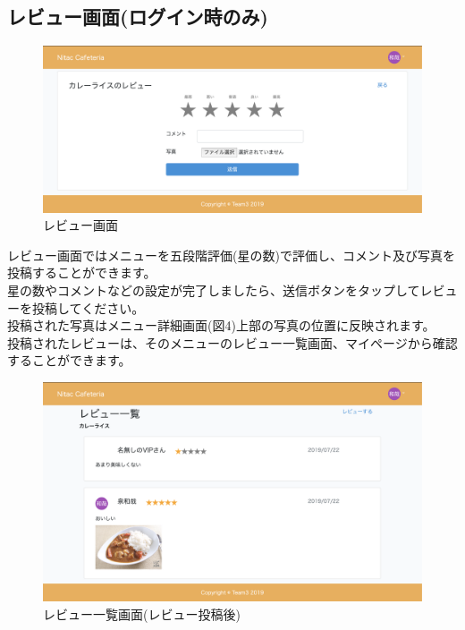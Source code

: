 \documentclass[a4paper]{jsarticle}
\begin{document}
\subsection{レビュー画面(ログイン時のみ)}
\begin{figure}[htbp]
\centering
	\includegraphics[scale = 0.225]{image/review2.png}
	\caption{レビュー画面}
\end{figure}
レビュー画面ではメニューを五段階評価(星の数)で評価し、コメント及び写真を投稿することができます。\\
星の数やコメントなどの設定が完了しましたら、送信ボタンをタップしてレビューを投稿してください。\\
投稿された写真はメニュー詳細画面(図4)上部の写真の位置に反映されます。\\
投稿されたレビューは、そのメニューのレビュー一覧画面、マイページから確認することができます。\\
\begin{figure}[htbp]
	\centering
		\includegraphics[scale = 0.225]{image/review_after_create.png}
		\caption{レビュー一覧画面(レビュー投稿後)}
	\end{figure}
	\newpage
\end{document}
